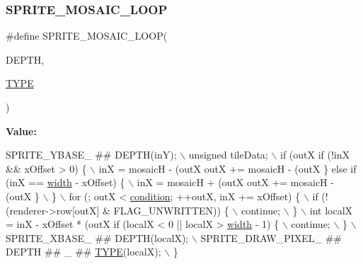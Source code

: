 \subsubsection{\texorpdfstring{S\+P\+R\+I\+T\+E\+\_\+\+M\+O\+S\+A\+I\+C\+\_\+\+L\+O\+OP}{SPRITE\_MOSAIC\_LOOP}}
{\footnotesize\ttfamily \#define S\+P\+R\+I\+T\+E\+\_\+\+M\+O\+S\+A\+I\+C\+\_\+\+L\+O\+OP(\begin{DoxyParamCaption}\item[{}]{D\+E\+P\+TH,  }\item[{}]{\mbox{\hyperlink{inflate_8h_a164ea0159d5f0b5f12a646f25f99eceaab47ea8bb955afd0adc0ef98517dd6084}{T\+Y\+PE}} }\end{DoxyParamCaption})}

{\bfseries Value\+:}
\begin{DoxyCode}
SPRITE\_YBASE\_ ## DEPTH(inY); \(\backslash\)
    unsigned tileData; \(\backslash\)
    if (outX %
        if (!inX && xOffset > 0) \{ \(\backslash\)
            inX = mosaicH - (outX %
            outX += mosaicH - (outX %
        \} \textcolor{keywordflow}{else} \textcolor{keywordflow}{if} (inX == \mbox{\hyperlink{gregbook_2readpng_8c_ad02cd220028343ea4b1943ff4aedc38d}{width}} - xOffset) \{ \(\backslash\)
            inX = mosaicH + (outX %
            outX += mosaicH - (outX %
        \} \(\backslash\)
    \} \(\backslash\)
    for (; outX < \mbox{\hyperlink{isa-lr35902_8c_a9cc5e499f71726f3a653debd7bf9ccc7}{condition}}; ++outX, inX += xOffset) \{ \(\backslash\)
        if (!(renderer->row[outX] & FLAG\_UNWRITTEN)) \{ \(\backslash\)
            continue; \(\backslash\)
        \} \(\backslash\)
        int localX = inX - xOffset * (outX %
        if (localX < 0 || localX > \mbox{\hyperlink{gregbook_2readpng_8c_ad02cd220028343ea4b1943ff4aedc38d}{width}} - 1) \{ \(\backslash\)
            continue; \(\backslash\)
        \} \(\backslash\)
        SPRITE\_XBASE\_ ## DEPTH(localX); \(\backslash\)
        SPRITE\_DRAW\_PIXEL\_ ## DEPTH ## \_ ## \mbox{\hyperlink{inflate9_8h_a164ea0159d5f0b5f12a646f25f99eceaab47ea8bb955afd0adc0ef98517dd6084}{TYPE}}(localX); \(\backslash\)
    \}
\end{DoxyCode}
\mbox{\label{software-obj_8c_ae8f834900ccb77f932ffc98dc17e0375}} 
